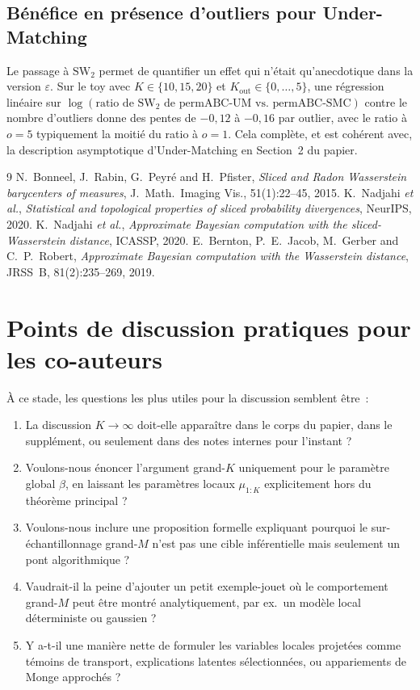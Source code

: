 \documentclass[11pt]{article}
\begin{document}
\subsection{Bénéfice en présence d'outliers pour Under-Matching}

Le passage à $\mathrm{SW}_2$ permet de quantifier un effet qui n'était qu'anecdotique dans la
version $\varepsilon$. Sur le toy avec $K\in\{10,15,20\}$ et $K_{\mathrm{out}}\in\{0,\dots,5\}$,
une régression linéaire sur $\log(\text{ratio de }\mathrm{SW}_2\text{ de permABC-UM vs.
permABC-SMC})$ contre le nombre d'outliers donne des pentes de $-0,12$ à $-0,16$ par outlier,
avec le ratio à $o=5$ typiquement la moitié du ratio à $o=1$. Cela complète, et est cohérent
avec, la description asymptotique d'Under-Matching en Section~2 du papier.

\begin{thebibliography}{9}
N.~Bonneel, J.~Rabin, G.~Peyr\'e and H.~Pfister,
\emph{Sliced and Radon Wasserstein barycenters of measures},
J.\ Math.\ Imaging Vis., 51(1):22--45, 2015.
K.~Nadjahi \emph{et al.},
\emph{Statistical and topological properties of sliced probability divergences},
NeurIPS, 2020.
K.~Nadjahi \emph{et al.},
\emph{Approximate Bayesian computation with the sliced-Wasserstein distance},
ICASSP, 2020.
E.~Bernton, P.~E.~Jacob, M.~Gerber and C.~P.~Robert,
\emph{Approximate Bayesian computation with the Wasserstein distance},
JRSS~B, 81(2):235--269, 2019.
\end{thebibliography}

\section{Points de discussion pratiques pour les co-auteurs}

À ce stade, les questions les plus utiles pour la discussion semblent être~:
\begin{enumerate}[label=(\arabic*)]
    \item La discussion $K \to \infty$ doit-elle apparaître dans le corps du papier, dans le
    supplément, ou seulement dans des notes internes pour l'instant ?
    \item Voulons-nous énoncer l'argument grand-$K$ uniquement pour le paramètre global $\beta$,
    en laissant les paramètres locaux $\mu_{1:K}$ explicitement hors du théorème principal ?
    \item Voulons-nous inclure une proposition formelle expliquant pourquoi le
    sur-échantillonnage grand-$M$ n'est pas une cible inférentielle mais seulement un pont
    algorithmique ?
    \item Vaudrait-il la peine d'ajouter un petit exemple-jouet où le comportement grand-$M$
    peut être montré analytiquement, par ex.\ un modèle local déterministe ou gaussien ?
    \item Y a-t-il une manière nette de formuler les variables locales projetées comme témoins
    de transport, explications latentes sélectionnées, ou appariements de Monge approchés ?
\end{enumerate}
\end{document}
